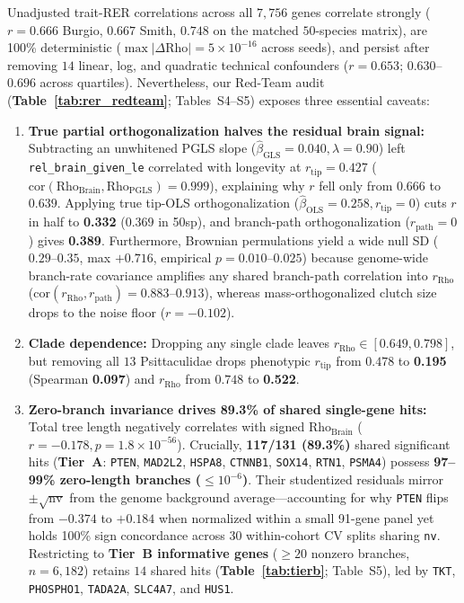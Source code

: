 \documentclass[10pt,a4paper,twocolumn]{article}
\begin{document}
Unadjusted trait-RER correlations across all $7,756$ genes correlate strongly ($r = 0.666$ Burgio, $0.667$ Smith, $0.748$ on the matched $50$-species matrix), are 100\% deterministic ($\max|\Delta\text{Rho}| = 5\times 10^{-16}$ across seeds), and persist after removing $14$ linear, log, and quadratic technical confounders ($r = 0.653$; $0.630$--$0.696$ across quartiles). Nevertheless, our Red-Team audit (\textbf{Table~\ref{tab:rer_redteam}}; Tables~S4--S5) exposes three essential caveats:
\begin{enumerate}
    \item \textbf{True partial orthogonalization halves the residual brain signal:} Subtracting an unwhitened PGLS slope ($\hat{\beta}_{\text{GLS}} = 0.040, \lambda = 0.90$) left \texttt{rel\_brain\_given\_le} correlated with longevity at $r_{\text{tip}} = 0.427$ ($\text{cor}(\text{Rho}_{\text{Brain}}, \text{Rho}_{\text{PGLS}}) = 0.999$), explaining why $r$ fell only from $0.666$ to $0.639$. Applying true tip-OLS orthogonalization ($\hat{\beta}_{\text{OLS}} = 0.258, r_{\text{tip}} = 0$) cuts $r$ in half to \textbf{0.332} ($0.369$ in 50sp), and branch-path orthogonalization ($r_{\text{path}} = 0$) gives \textbf{0.389}. Furthermore, Brownian permulations yield a wide null SD ($0.29$--$0.35$, max $+0.716$, empirical $p = 0.010$--$0.025$) because genome-wide branch-rate covariance amplifies any shared branch-path correlation into $r_{\text{Rho}}$ ($\text{cor}(r_{\text{Rho}}, r_{\text{path}}) = 0.883$--$0.913$), whereas mass-orthogonalized clutch size drops to the noise floor ($r = -0.102$).
    \item \textbf{Clade dependence:} Dropping any single clade leaves $r_{\text{Rho}} \in [0.649, 0.798]$, but removing all $13$ Psittaculidae drops phenotypic $r_{\text{tip}}$ from $0.478$ to \textbf{0.195} (Spearman \textbf{0.097}) and $r_{\text{Rho}}$ from $0.748$ to \textbf{0.522}.
    \item \textbf{Zero-branch invariance drives 89.3\% of shared single-gene hits:} Total tree length negatively correlates with signed $\text{Rho}_{\text{Brain}}$ ($r = -0.178, p = 1.8\times 10^{-56}$). Crucially, \textbf{117/131 (89.3\%)} shared significant hits (\textbf{Tier~A}: \texttt{PTEN}, \texttt{MAD2L2}, \texttt{HSPA8}, \texttt{CTNNB1}, \texttt{SOX14}, \texttt{RTN1}, \texttt{PSMA4}) possess \textbf{97--99\% zero-length branches ($\le 10^{-6}$)}. Their studentized residuals mirror $\pm\sqrt{\text{nv}}$ from the genome background average—accounting for why \texttt{PTEN} flips from $-0.374$ to $+0.184$ when normalized within a small 91-gene panel yet holds 100\% sign concordance across 30 within-cohort CV splits sharing \texttt{nv}. Restricting to \textbf{Tier~B informative genes} ($\ge 20$ nonzero branches, $n = 6,182$) retains $14$ shared hits (\textbf{Table~\ref{tab:tierb}}; Table~S5), led by \texttt{TKT}, \texttt{PHOSPHO1}, \texttt{TADA2A}, \texttt{SLC4A7}, and \texttt{HUS1}.
\end{enumerate}
\end{document}

